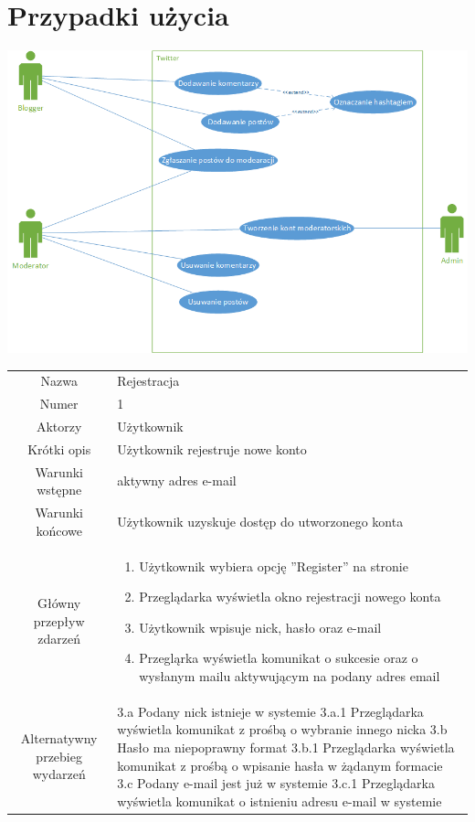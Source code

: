 \documentclass[a4paper]{article}
\begin{document}
\section{Przypadki użycia}
\includegraphics[width=\textwidth]{usecase}
\begin{tabular}{c p{10cm}}
Nazwa& Rejestracja	\\
Numer	& 1\\
Aktorzy & Użytkownik \\
Krótki opis & Użytkownik rejestruje nowe konto \\
Warunki wstępne&  aktywny adres e-mail\\
Warunki końcowe& Użytkownik uzyskuje dostęp do utworzonego konta\\
Główny przepływ zdarzeń&
\begin{enumerate}
\item Użytkownik wybiera opcję ''Register'' na stronie
\item Przeglądarka wyświetla okno rejestracji nowego konta
\item Użytkownik wpisuje nick, hasło oraz e-mail
\item Przegląrka wyświetla komunikat o sukcesie oraz o wysłanym mailu aktywującym na podany adres email
\end{enumerate} \\
Alternatywny przebieg wydarzeń &
3.a Podany nick istnieje w systemie \newline
3.a.1 Przeglądarka wyświetla komunikat z prośbą o wybranie innego nicka\newline
3.b Hasło ma niepoprawny format \newline
3.b.1 Przeglądarka wyświetla komunikat z prośbą o wpisanie hasła w żądanym formacie\newline
3.c Podany e-mail jest już w systemie \newline
3.c.1 Przeglądarka wyświetla komunikat o istnieniu adresu e-mail w systemie \newline
\\
\end{tabular}
\end{document}
